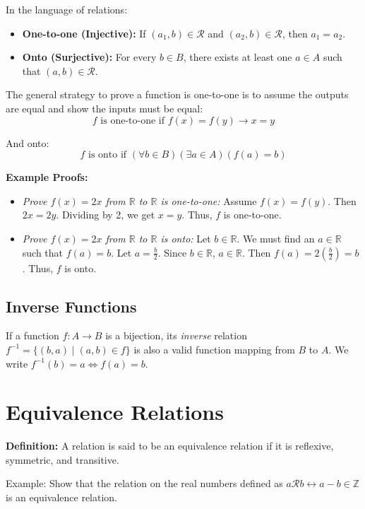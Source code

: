 \documentclass{article}
\begin{document}
    In the language of relations:
    \begin{itemize}
        \item \textbf{One-to-one (Injective):} If $(a_1, b) \in \mathcal{R}$ and $(a_2, b) \in \mathcal{R}$, then $a_1 = a_2$.
        \item \textbf{Onto (Surjective):} For every $b \in B$, there exists at least one $a \in A$ such that $(a, b) \in \mathcal{R}$.
    \end{itemize}
    
    The general strategy to prove a function is one-to-one is to assume the outputs are equal and show the inputs must be equal:
    $$f\text{ is one-to-one if } f(x) = f(y) \rightarrow x = y$$
    
    And onto:
    $$f\text{ is onto if } (\forall b\in B)(\exists a\in A) (f(a)=b)$$
    
    \textbf{Example Proofs:}
    \begin{itemize}
        \item \textit{Prove $f(x) = 2x$ from $\mathbb{R}$ to $\mathbb{R}$ is one-to-one:} Assume $f(x) = f(y)$. Then $2x = 2y$. Dividing by 2, we get $x = y$. Thus, $f$ is one-to-one.
        \item \textit{Prove $f(x) = 2x$ from $\mathbb{R}$ to $\mathbb{R}$ is onto:} Let $b \in \mathbb{R}$. We must find an $a \in \mathbb{R}$ such that $f(a) = b$. Let $a = \frac{b}{2}$. Since $b \in \mathbb{R}$, $a \in \mathbb{R}$. Then $f(a) = 2(\frac{b}{2}) = b$. Thus, $f$ is onto.
    \end{itemize}

\subsection*{Inverse Functions}
    If a function $f: A \rightarrow B$ is a bijection, its \textit{inverse} relation $f^{-1} = \{(b, a) \mid (a, b) \in f\}$ is also a valid function mapping from $B$ to $A$. We write $f^{-1}(b) = a \iff f(a) = b$.

\section*{Equivalence Relations}
    
    \textbf{Definition:} A relation is said to be an equivalence relation if it is reflexive, symmetric, and transitive. 

    \vspace{1.5mm}
    Example: Show that the relation on the real numbers defined as $a\mathcal{R}b \leftrightarrow a-b\in \mathbb{Z}$ is an equivalence relation.
    
\end{document}
